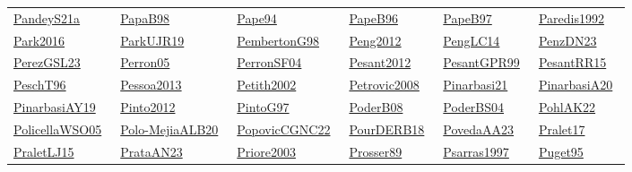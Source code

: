 \begin{longtable}{*{6}{l}}
\href{../works/PandeyS21a.pdf}{PandeyS21a}~\cite{PandeyS21a} & \href{../works/PapaB98.pdf}{PapaB98}~\cite{PapaB98} & \href{../works/Pape94.pdf}{Pape94}~\cite{Pape94} & \href{../}{PapeB96}~\cite{PapeB96} & \href{../works/PapeB97.pdf}{PapeB97}~\cite{PapeB97} & \href{../}{Paredis1992}~\cite{Paredis1992}\\ 
\href{../}{Park2016}~\cite{Park2016} & \href{../works/ParkUJR19.pdf}{ParkUJR19}~\cite{ParkUJR19} & \href{../works/PembertonG98.pdf}{PembertonG98}~\cite{PembertonG98} & \href{../}{Peng2012}~\cite{Peng2012} & \href{../works/PengLC14.pdf}{PengLC14}~\cite{PengLC14} & \href{../works/PenzDN23.pdf}{PenzDN23}~\cite{PenzDN23}\\ 
\href{../works/PerezGSL23.pdf}{PerezGSL23}~\cite{PerezGSL23} & \href{../works/Perron05.pdf}{Perron05}~\cite{Perron05} & \href{../works/PerronSF04.pdf}{PerronSF04}~\cite{PerronSF04} & \href{../}{Pesant2012}~\cite{Pesant2012} & \href{../works/PesantGPR99.pdf}{PesantGPR99}~\cite{PesantGPR99} & \href{../works/PesantRR15.pdf}{PesantRR15}~\cite{PesantRR15}\\ 
\href{../}{PeschT96}~\cite{PeschT96} & \href{../}{Pessoa2013}~\cite{Pessoa2013} & \href{../}{Petith2002}~\cite{Petith2002} & \href{../}{Petrovic2008}~\cite{Petrovic2008} & \href{../}{Pinarbasi21}~\cite{Pinarbasi21} & \href{../}{PinarbasiA20}~\cite{PinarbasiA20}\\ 
\href{../works/PinarbasiAY19.pdf}{PinarbasiAY19}~\cite{PinarbasiAY19} & \href{../}{Pinto2012}~\cite{Pinto2012} & \href{../works/PintoG97.pdf}{PintoG97}~\cite{PintoG97} & \href{../works/PoderB08.pdf}{PoderB08}~\cite{PoderB08} & \href{../works/PoderBS04.pdf}{PoderBS04}~\cite{PoderBS04} & \href{../works/PohlAK22.pdf}{PohlAK22}~\cite{PohlAK22}\\ 
\href{../works/PolicellaWSO05.pdf}{PolicellaWSO05}~\cite{PolicellaWSO05} & \href{../works/Polo-MejiaALB20.pdf}{Polo-MejiaALB20}~\cite{Polo-MejiaALB20} & \href{../works/PopovicCGNC22.pdf}{PopovicCGNC22}~\cite{PopovicCGNC22} & \href{../works/PourDERB18.pdf}{PourDERB18}~\cite{PourDERB18} & \href{../works/PovedaAA23.pdf}{PovedaAA23}~\cite{PovedaAA23} & \href{../works/Pralet17.pdf}{Pralet17}~\cite{Pralet17}\\ 
\href{../works/PraletLJ15.pdf}{PraletLJ15}~\cite{PraletLJ15} & \href{../works/PrataAN23.pdf}{PrataAN23}~\cite{PrataAN23} & \href{../}{Priore2003}~\cite{Priore2003} & \href{../works/Prosser89.pdf}{Prosser89}~\cite{Prosser89} & \href{../}{Psarras1997}~\cite{Psarras1997} & \href{../works/Puget95.pdf}{Puget95}~\cite{Puget95}\\ 

\end{longtable}
